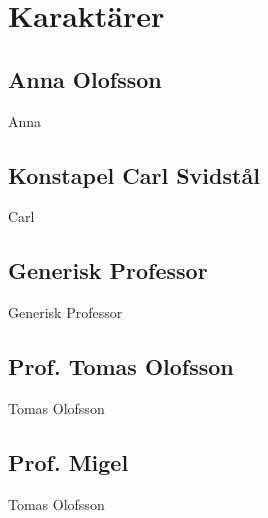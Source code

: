 \section{Karaktärer}
\subsection{Anna Olofsson}
\label{kar:AnnaOlofsson}
Anna
%
\subsection{Konstapel Carl Svidstål}
\label{kar:KonstapelCarlSvidstal}
Carl
%
\subsection{Generisk Professor}
\label{kar:GeneriskProfessor}
Generisk Professor
%
\subsection{Prof. Tomas Olofsson}
\label{kar:TomasOlofsson}
Tomas Olofsson
%
\subsection{Prof. Migel}
\label{kar:TomasOlofsson}
Tomas Olofsson
